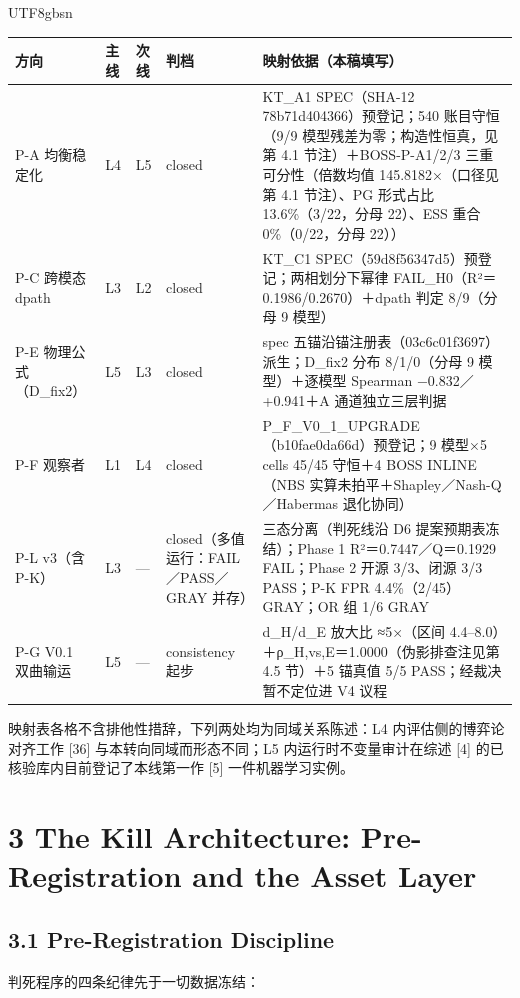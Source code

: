 \documentclass[10pt,a4paper]{article}
\begin{document}
\begin{CJK}{UTF8}{gbsn}
\begin{longtable}{>{\raggedright\arraybackslash}p{68pt}>{\raggedright\arraybackslash}p{20pt}>{\raggedright\arraybackslash}p{20pt}>{\raggedright\arraybackslash}p{70pt}>{\raggedright\arraybackslash}p{202pt}}
\toprule
\textbf{方向} & \textbf{主线} & \textbf{次线} & \textbf{判档} & \textbf{映射依据（本稿填写）} \\
\midrule
\endhead
P-A 均衡稳定化 & L4 & L5 & closed & KT\_A1 SPEC（SHA-12 78b71d404366）预登记；540 账目守恒（9/9 模型残差为零；构造性恒真，见第 4.1 节注）＋BOSS-P-A1/2/3 三重可分性（倍数均值 145.8182×（口径见第 4.1 节注）、PG 形式占比 13.6\%（3/22，分母 22）、ESS 重合 0\%（0/22，分母 22）） \\
P-C 跨模态 dpath & L3 & L2 & closed & KT\_C1 SPEC（59d8f56347d5）预登记；两相划分下幂律 FAIL\_H0（R²＝0.1986/0.2670）＋dpath 判定 8/9（分母 9 模型） \\
P-E 物理公式（D\_fix2） & L5 & L3 & closed & spec 五锚沿锚注册表（03c6c01f3697）派生；D\_fix2 分布 8/1/0（分母 9 模型）＋逐模型 Spearman −0.832／+0.941＋A 通道独立三层判据 \\
P-F 观察者 & L1 & L4 & closed & P\_F\_V0\_1\_UPGRADE（b10fae0da66d）预登记；9 模型×5 cells 45/45 守恒＋4 BOSS INLINE（NBS 实算未拍平＋Shapley／Nash-Q／Habermas 退化协同） \\
P-L v3（含 P-K） & L3 & — & closed（多值运行：FAIL／PASS／GRAY 并存） & 三态分离（判死线沿 D6 提案预期表冻结）；Phase 1 R²＝0.7447／Q＝0.1929 FAIL；Phase 2 开源 3/3、闭源 3/3 PASS；P-K FPR 4.4\%（2/45）GRAY；OR 组 1/6 GRAY \\
P-G V0.1 双曲输运 & L5 & — & consistency 起步 & d\_H/d\_E 放大比 ≈5×（区间 4.4–8.0）＋ρ\_H,vs,E＝1.0000（伪影排查注见第 4.5 节）＋5 锚真值 5/5 PASS；经裁决暂不定位进 V4 议程 \\
\bottomrule
\end{longtable}

映射表各格不含排他性措辞，下列两处均为同域关系陈述：L4 内评估侧的博弈论对齐工作 [36] 与本转向同域而形态不同；L5 内运行时不变量审计在综述 [4] 的已核验库内目前登记了本线第一作 [5] 一件机器学习实例。


\section*{3 The Kill Architecture: Pre-Registration and the Asset Layer}\subsection*{3.1 Pre-Registration Discipline}判死程序的四条纪律先于一切数据冻结：


\end{CJK}
\end{document}
